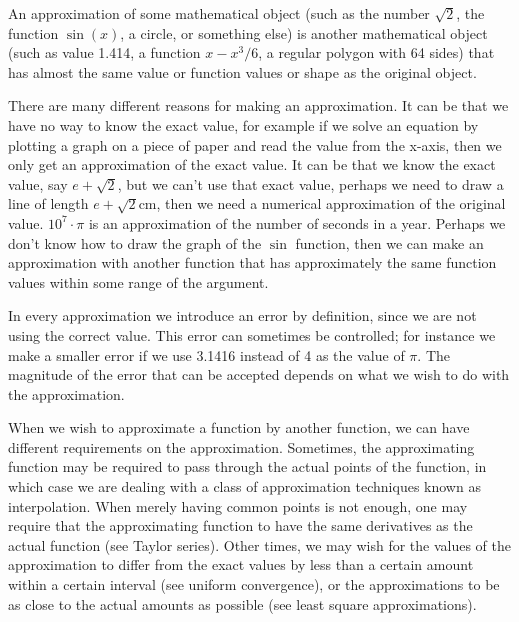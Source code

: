 \documentclass[12pt]{article}
\begin{document}
An approximation of some mathematical object (such as the number $\sqrt{2}$, the function $\sin(x)$, a circle,  or something else) is another mathematical object (such as value 1.414,  a function $x-x^3/6$, a  regular polygon with 
64 sides) that has almost the same value or function values or shape as the original object.

There are many different reasons for making an approximation. It can be that we have no way to know the exact value, 
for example if we solve an equation by plotting a graph on a piece of paper and read the value from the x-axis, then 
we only get an approximation of the exact value.  It can be that we know the exact value, say $e+\sqrt{2}$, but we 
can't use that exact value, perhaps we need to draw a line of length $e+\sqrt{2}$cm, then we need a numerical approximation of the original value. $10^7\cdot \pi$ is an approximation of the number of seconds in a year.
Perhaps we don't know how to draw the graph of the $\sin$ function, then we can make an approximation with another function that has approximately the same function values within some range of the argument.

In every approximation we introduce an error by definition, since we are not using the correct value. This error can sometimes be controlled; for instance we make a smaller error if we use 3.1416 instead of 4 as the value of $\pi$. 
The magnitude of the error that can be accepted depends on what we wish to do with the approximation.

When we wish to approximate a function by another function, we can have different requirements on the approximation.  Sometimes, the approximating function may be required to pass through the actual points of the function, in which case we are dealing with a class of approximation techniques known as interpolation.  When merely having common points is not enough, one may require that the approximating function to have the same derivatives as the actual function (see Taylor series).  Other times, we may wish for the values of the approximation to differ from the exact values by less than a
certain amount within a certain interval (see uniform convergence), or the approximations to be as close to the actual amounts as possible (see least square approximations). \\
\end{document}
